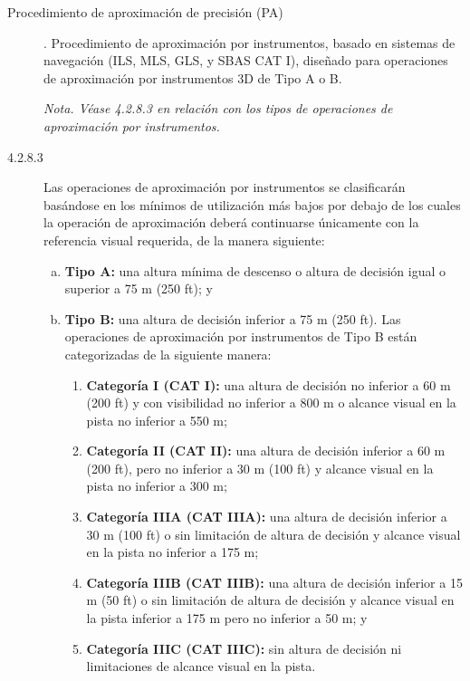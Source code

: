 \begin{tcolorbox}[title={Procedimiento de aproximación por instrumentos (IAP). OACI Anexo 6. Edición 2018}]
{\begin{description}
\item[ Procedimiento de aproximación de precisión (PA)]. Procedimiento de aproximación por instrumentos, basado en sistemas
de navegación (ILS, MLS, GLS, y SBAS CAT I), diseñado para operaciones de aproximación por instrumentos 3D de
Tipo A o B.

\emph{Nota. Véase 4.2.8.3 en relación con los tipos de operaciones de aproximación por instrumentos.
}

\end{description}
  }
\end{tcolorbox}

\begin{tcolorbox}
  {\footnotesize

    \begin{description}
      
\item[4.2.8.3] Las operaciones de aproximación por instrumentos se clasificarán basándose en los mínimos de utilización más
bajos por debajo de los cuales la operación de aproximación deberá continuarse únicamente con la referencia visual requerida,
de la manera siguiente:

\begin{enumerate}[a)]
\item \textbf{Tipo A:} una altura mínima de descenso o altura de decisión igual o superior a 75 m (250 ft); y
\item \textbf{Tipo B:} una altura de decisión inferior a 75 m (250 ft). Las operaciones de aproximación por instrumentos de Tipo B están categorizadas de la siguiente manera:
  \begin{enumerate}[1)]
  \item  \textbf{Categoría I (CAT I):} una altura de decisión no inferior a
    60 m (200 ft) y con visibilidad no inferior a 800 m o alcance
    visual en la pista no inferior a 550 m; 
  \item \textbf{Categoría II (CAT II):}
    una altura de decisión inferior a 60 m (200 ft), pero no inferior
    a 30 m (100 ft) y alcance visual en la pista no inferior a 300 m;
    
  \item \textbf{Categoría IIIA (CAT IIIA):} una altura de decisión inferior a 30
    m (100 ft) o sin limitación de altura de decisión y alcance visual
    en la pista no inferior a 175 m; 
  \item \textbf{Categoría IIIB (CAT IIIB):} una
    altura de decisión inferior a 15 m (50 ft) o sin limitación de
    altura de decisión y alcance visual en la pista inferior a 175 m
    pero no inferior a 50 m; y 
  \item \textbf{Categoría IIIC (CAT IIIC):} sin
    altura de decisión ni limitaciones de alcance visual en la pista.
\end{enumerate}


\end{enumerate}
\end{description}}
\end{tcolorbox}
